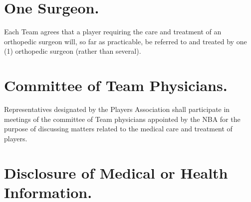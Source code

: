 \documentclass[
]{book}
\begin{document}

\hypertarget{one-surgeon.}{%
\section{One Surgeon.}\label{one-surgeon.}}

Each Team agrees that a player requiring the care and treatment of an
orthopedic surgeon will, so far as practicable, be referred to and treated by one (1) orthopedic surgeon (rather than several).

\hypertarget{committee-of-team-physicians.}{%
\section{Committee of Team Physicians.}\label{committee-of-team-physicians.}}

Representatives designated by the Players Association shall participate in meetings of the committee of Team physicians appointed by the NBA for the purpose of discussing matters related to the medical care and treatment of players.

\hypertarget{disclosure-of-medical-or-health-information.}{%
\section{Disclosure of Medical or Health Information.}\label{disclosure-of-medical-or-health-information.}}
\end{document}
